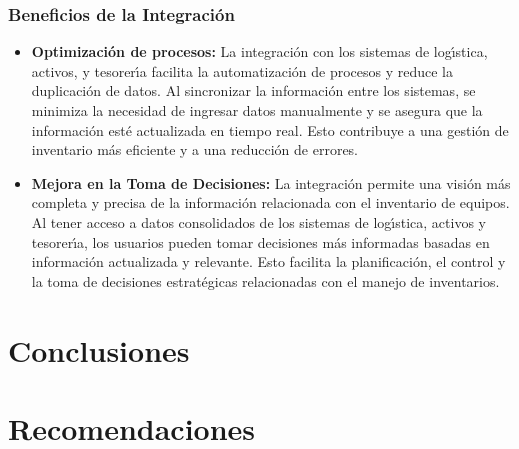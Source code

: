 \documentclass[stu, 12pt, letterpaper, donotrepeattitle, floatsintext, natbib]{apa7}
\begin{document}
\subsubsection{Beneficios de la Integraci\'on}
\begin{itemize}
    \item\textbf{Optimizaci\'on de procesos: }La integraci\'on con los sistemas de log\'{\i}stica, activos, y tesorer\'{\i}a facilita la automatizaci\'on de procesos y reduce la duplicaci\'on de datos. Al sincronizar la informaci\'on entre los sistemas, se minimiza la necesidad de ingresar datos manualmente y se asegura que la informaci\'on est\'e actualizada en tiempo real. Esto contribuye a una gesti\'on de inventario m\'as eficiente y a una reducci\'on de errores.
    \item\textbf{Mejora en la Toma de Decisiones: }La integraci\'on permite una visi\'on m\'as completa y precisa de la informaci\'on relacionada con el inventario de equipos. Al tener acceso a datos consolidados de los sistemas de log\'{\i}stica, activos y tesorer\'{\i}a, los usuarios pueden tomar decisiones m\'as informadas basadas en informaci\'on actualizada y relevante. Esto facilita la planificaci\'on, el control y la toma de decisiones estrat\'egicas relacionadas con el manejo de inventarios.
\end{itemize}

\newpage
\section{Conclusiones}
\newpage
\section{Recomendaciones}
\newpage

\end{document}
